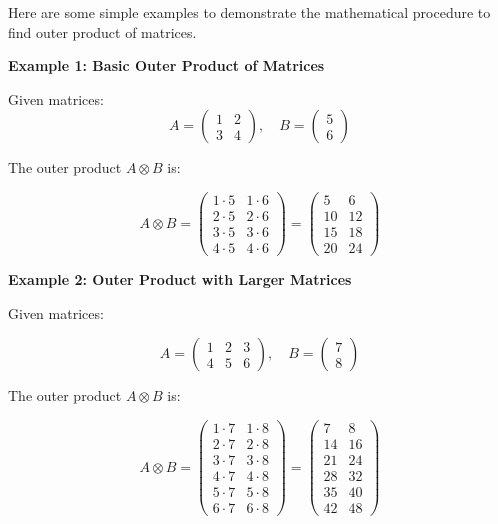 \documentclass[
  letterpaper,
  DIV=11,
  numbers=noendperiod]{scrreprt}
\theoremstyle{plain}
\theoremstyle{definition}
\theoremstyle{remark}
\begin{document}
Here are some simple examples to demonstrate the mathematical procedure
to find outer product of matrices.

\textbf{Example 1: Basic Outer Product of Matrices}

Given matrices: \[
A = \begin{pmatrix}
1 & 2 \\
3 & 4
\end{pmatrix}, \quad
B = \begin{pmatrix}
5 \\
6
\end{pmatrix}\]

The outer product \(A \otimes B\) is:

\[A \otimes B = \begin{pmatrix}
1 \cdot 5 & 1 \cdot 6 \\
2 \cdot 5 & 2 \cdot 6 \\
3 \cdot 5 & 3 \cdot 6 \\
4 \cdot 5 & 4 \cdot 6
\end{pmatrix} = \begin{pmatrix}
5 & 6 \\
10 & 12 \\
15 & 18 \\
20 & 24
\end{pmatrix}\]

\textbf{Example 2: Outer Product with Larger Matrices}

Given matrices:

\[A = \begin{pmatrix}
1 & 2 & 3 \\
4 & 5 & 6
\end{pmatrix}, \quad
B = \begin{pmatrix}
7 \\
8
\end{pmatrix}\]

The outer product \(A \otimes B\) is:

\[A \otimes B = \begin{pmatrix}
1 \cdot 7 & 1 \cdot 8 \\
2 \cdot 7 & 2 \cdot 8 \\
3 \cdot 7 & 3 \cdot 8 \\
4 \cdot 7 & 4 \cdot 8 \\
5 \cdot 7 & 5 \cdot 8 \\
6 \cdot 7 & 6 \cdot 8
\end{pmatrix} = \begin{pmatrix}
7 & 8 \\
14 & 16 \\
21 & 24 \\
28 & 32 \\
35 & 40 \\
42 & 48
\end{pmatrix}\]
\end{document}
